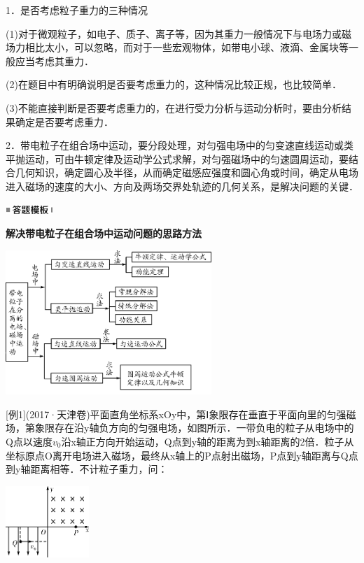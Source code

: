 \documentclass[cn,10.5pt,chinese,mac,chinesefont=founder]{elegantbook}
\begin{document}
1．是否考虑粒子重力的三种情况

(1)对于微观粒子，如电子、质子、离子等，因为其重力一般情况下与电场力或磁场力相比太小，可以忽略，而对于一些宏观物体，如带电小球、液滴、金属块等一般应当考虑其重力．

(2)在题目中有明确说明是否要考虑重力的，这种情况比较正规，也比较简单．

(3)不能直接判断是否要考虑重力的，在进行受力分析与运动分析时，要由分析结果确定是否要考虑重力．

2．带电粒子在组合场中运动，要分段处理，对匀强电场中的匀变速直线运动或类平抛运动，可由牛顿定律及运动学公式求解，对匀强磁场中的匀速圆周运动，要结合几何知识，确定圆心及半径，从而确定磁感应强度和圆心角或时间，确定从电场进入磁场的速度的大小、方向及两场交界处轨迹的几何关系，是解决问题的关键．

\begin{center}\includegraphics[width=0.70764in,height=0.12292in]{media/image25.png}\end{center}
\begin{center}
	\textbf{解决带电粒子在组合场中运动问题的思路方法}
\end{center}

\begin{center}\includegraphics[width=3.06597in,height=2.15069in]{media/image377.png}\end{center}

{[}例1{]}(2017·天津卷)平面直角坐标系xOy中，第Ⅰ象限存在垂直于平面向里的匀强磁场，第\uppercase\expandafter{}象限存在沿y轴负方向的匀强电场，如图所示．一带负电的粒子从电场中的Q点以速度$v_0$沿x轴正方向开始运动，Q点到y轴的距离为到x轴距离的2倍．粒子从坐标原点O离开电场进入磁场，最终从x轴上的P点射出磁场，P点到y轴距离与Q点到y轴距离相等．不计粒子重力，问：

\begin{center}\includegraphics[width=1.24514in,height=1.06597in]{media/image378.png}\end{center}
\end{document}
